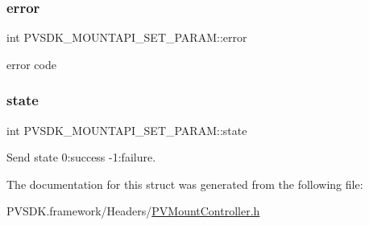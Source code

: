 \subsubsection{\texorpdfstring{error}{error}}
{\footnotesize\ttfamily int P\+V\+S\+D\+K\+\_\+\+M\+O\+U\+N\+T\+A\+P\+I\+\_\+\+S\+E\+T\+\_\+\+P\+A\+R\+A\+M\+::error}



error code 

\mbox{\label{struct_p_v_s_d_k___m_o_u_n_t_a_p_i___s_e_t___p_a_r_a_m_a1bd6f5f734c3eca3b69a064a4aa77445}} 
\subsubsection{\texorpdfstring{state}{state}}
{\footnotesize\ttfamily int P\+V\+S\+D\+K\+\_\+\+M\+O\+U\+N\+T\+A\+P\+I\+\_\+\+S\+E\+T\+\_\+\+P\+A\+R\+A\+M\+::state}



Send state 0\+:success -\/1\+:failure. 



The documentation for this struct was generated from the following file\+:\begin{DoxyCompactItemize}
\item 
P\+V\+S\+D\+K.\+framework/\+Headers/\hyperlink{_p_v_mount_controller_8h}{P\+V\+Mount\+Controller.\+h}\end{DoxyCompactItemize}
